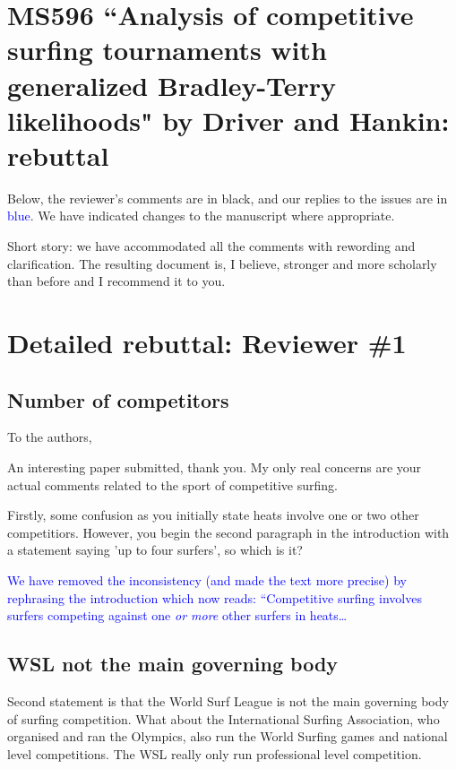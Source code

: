 \documentclass[12pt]{article}
\begin{document}
\section*{MS596 ``Analysis of competitive surfing tournaments with generalized Bradley-Terry likelihoods" by Driver and Hankin: rebuttal}

Below, the reviewer's comments are in black, and our replies to the
issues are in \textcolor{blue}{blue}.  We have indicated changes to
the manuscript where appropriate.

Short story: we have accommodated all the comments with rewording and
clarification.  The resulting document is, I believe, stronger and
more scholarly than before and I recommend it to you.

\section*{Detailed rebuttal: Reviewer \#1}



\subsection*{Number of competitors}

To the authors,

An interesting paper submitted, thank you. My only
real concerns are your actual comments related to the sport of
competitive surfing.

Firstly, some confusion as you initially state heats involve one or
two other competitiors. However, you begin the second paragraph in the
introduction with a statement saying 'up to four surfers', so which is
it?

\textcolor{blue}{We have removed the inconsistency (and made the text
  more precise) by rephrasing the introduction which now reads:
  ``Competitive surfing involves surfers competing against one {\em or
    more} other surfers in heats\ldots}

\subsection*{WSL not the main governing body}

Second statement is that the World Surf League is not the main
governing body of surfing competition. What about the International
Surfing Association, who organised and ran the Olympics, also run the
World Surfing games and national level competitions. The WSL really
only run professional level competition.
\end{document}
